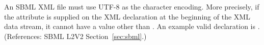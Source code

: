 An SBML XML file must use UTF-8 as the character encoding.  More
precisely, if the  attribute is supplied on the
XML declaration at the beginning of the XML data stream, it cannot
have a value other than .  An example valid declaration
is .  (References:
SBML L2V2 Section~\ref{sec:sbml}.)
